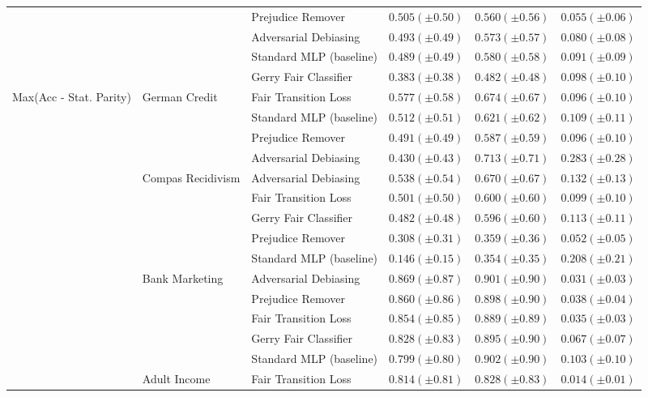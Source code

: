 \begin{tabular}{llllll}
 &  & Prejudice Remover & $0.505 (\pm0.50)$ & $0.560 (\pm0.56)$ & $0.055 (\pm0.06)$ \\
 &  & Adversarial Debiasing & $0.493 (\pm0.49)$ & $0.573 (\pm0.57)$ & $0.080 (\pm0.08)$ \\
 &  & Standard MLP (baseline) & $0.489 (\pm0.49)$ & $0.580 (\pm0.58)$ & $0.091 (\pm0.09)$ \\
 &  & Gerry Fair Classifier & $0.383 (\pm0.38)$ & $0.482 (\pm0.48)$ & $0.098 (\pm0.10)$ \\
\cline{1-6} \cline{2-6}
\multirow[t]{19}{*}{Max(Acc - Stat. Parity)} & \multirow[t]{4}{*}{German Credit} & Fair Transition Loss & $0.577 (\pm0.58)$ & $0.674 (\pm0.67)$ & $0.096 (\pm0.10)$ \\
 &  & Standard MLP (baseline) & $0.512 (\pm0.51)$ & $0.621 (\pm0.62)$ & $0.109 (\pm0.11)$ \\
 &  & Prejudice Remover & $0.491 (\pm0.49)$ & $0.587 (\pm0.59)$ & $0.096 (\pm0.10)$ \\
 &  & Adversarial Debiasing & $0.430 (\pm0.43)$ & $0.713 (\pm0.71)$ & $0.283 (\pm0.28)$ \\
\cline{2-6}
 & \multirow[t]{5}{*}{Compas Recidivism} & Adversarial Debiasing & $0.538 (\pm0.54)$ & $0.670 (\pm0.67)$ & $0.132 (\pm0.13)$ \\
 &  & Fair Transition Loss & $0.501 (\pm0.50)$ & $0.600 (\pm0.60)$ & $0.099 (\pm0.10)$ \\
 &  & Gerry Fair Classifier & $0.482 (\pm0.48)$ & $0.596 (\pm0.60)$ & $0.113 (\pm0.11)$ \\
 &  & Prejudice Remover & $0.308 (\pm0.31)$ & $0.359 (\pm0.36)$ & $0.052 (\pm0.05)$ \\
 &  & Standard MLP (baseline) & $0.146 (\pm0.15)$ & $0.354 (\pm0.35)$ & $0.208 (\pm0.21)$ \\
\cline{2-6}
 & \multirow[t]{5}{*}{Bank Marketing} & Adversarial Debiasing & $0.869 (\pm0.87)$ & $0.901 (\pm0.90)$ & $0.031 (\pm0.03)$ \\
 &  & Prejudice Remover & $0.860 (\pm0.86)$ & $0.898 (\pm0.90)$ & $0.038 (\pm0.04)$ \\
 &  & Fair Transition Loss & $0.854 (\pm0.85)$ & $0.889 (\pm0.89)$ & $0.035 (\pm0.03)$ \\
 &  & Gerry Fair Classifier & $0.828 (\pm0.83)$ & $0.895 (\pm0.90)$ & $0.067 (\pm0.07)$ \\
 &  & Standard MLP (baseline) & $0.799 (\pm0.80)$ & $0.902 (\pm0.90)$ & $0.103 (\pm0.10)$ \\
\cline{2-6}
 & \multirow[t]{5}{*}{Adult Income} & Fair Transition Loss & $0.814 (\pm0.81)$ & $0.828 (\pm0.83)$ & $0.014 (\pm0.01)$ \\

\end{tabular}
